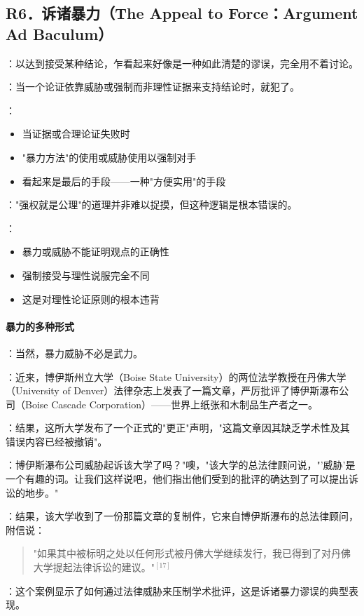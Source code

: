 \subsection{R6．诉诸暴力（The Appeal to Force：Argument Ad Baculum）}

\begin{theorembox}[title=诉诸暴力谬误的定义与特征]
：以达到接受某种结论，乍看起来好像是一种如此清楚的谬误，完全用不着讨论。

：当一个论证依靠威胁或强制而非理性证据来支持结论时，就犯了。

：
\begin{itemize}
  \item 当证据或合理论证失败时
  \item "暴力方法"的使用或威胁使用以强制对手
  \item 看起来是最后的手段——一种"方便实用"的手段
\end{itemize}

："强权就是公理"的道理并非难以捉摸，但这种逻辑是根本错误的。

：
\begin{itemize}
  \item 暴力或威胁不能证明观点的正确性
  \item 强制接受与理性说服完全不同
  \item 这是对理性论证原则的根本违背
\end{itemize}
\end{theorembox}

\paragraph{暴力的多种形式}
\begin{examplebox}[title=法律威胁案例]
：当然，暴力威胁不必是武力。

：近来，博伊斯州立大学（Boise State University）的两位法学教授在丹佛大学（University of Denver）法律杂志上发表了一篇文章，严厉批评了博伊斯瀑布公司（Boise Cascade Corporation）——世界上纸张和木制品生产者之一。

：结果，这所大学发布了一个正式的"更正"声明，"这篇文章因其缺乏学术性及其错误内容已经被撤销"。

：博伊斯瀑布公司威胁起诉该大学了吗？"噢，"该大学的总法律顾问说，"'威胁'是一个有趣的词。让我们这样说吧，他们指出他们受到的批评的确达到了可以提出诉讼的地步。"

：结果，该大学收到了一份那篇文章的复制件，它来自博伊斯瀑布的总法律顾问，附信说：

\begin{quote}
"如果其中被标明之处以任何形式被丹佛大学继续发行，我已得到了对丹佛大学提起法律诉讼的建议。"$^{[17]}$
\end{quote}

：这个案例显示了如何通过法律威胁来压制学术批评，这是诉诸暴力谬误的典型表现。
\end{examplebox}

